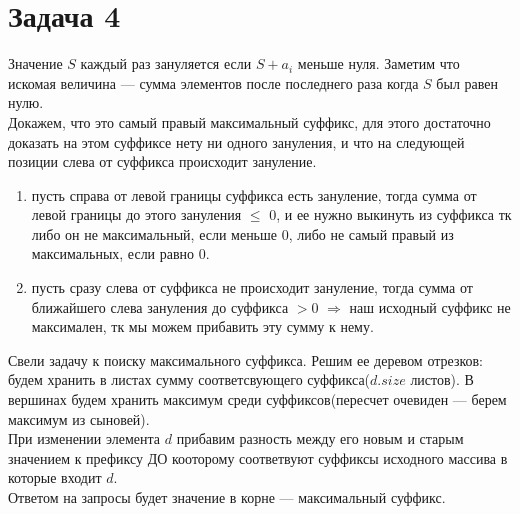 \documentclass{article}
\begin{document}
\section{Задача 4}
Значение $S$ каждый раз зануляется если $S+a_i$ меньше нуля. Заметим что искомая величина --- сумма элементов после последнего раза когда $S$ был равен нулю.\\ 
Докажем, что это самый правый максимальный суффикс, для этого достаточно доказать на этом суффиксе нету ни одного зануления, и что на следующей позиции слева от суффикса происходит зануление.
\begin{enumerate}
\item пусть справа от левой границы суффикса есть зануление, тогда сумма от левой границы до этого зануления $\leq$ $0$, и ее нужно выкинуть из суффикса тк либо он не максимальный, если меньше 0, либо не самый правый из максимальных, если равно 0.
\item пусть сразу слева от суффикса не происходит зануление, тогда сумма от ближайшего слева зануления до суффикса $> 0$ $\Rightarrow$ наш исходный суффикс не максимален, тк мы можем прибавить эту сумму к нему.
\end{enumerate}
Свели задачу к поиску максимального суффикса. Решим ее деревом отрезков: будем хранить в листах сумму соответсвующего суффикса($d.size$ листов). В вершинах будем хранить максимум среди суффиксов(пересчет очевиден --- берем максимум из сыновей).\\
При изменении элемента $d$ прибавим разность между его новым и старым значением к префиксу ДО кооторому соответвуют суффиксы исходного массива в которые входит $d$. \\
Ответом на запросы будет значение в корне --- максимальный суффикс.
\end{document}
